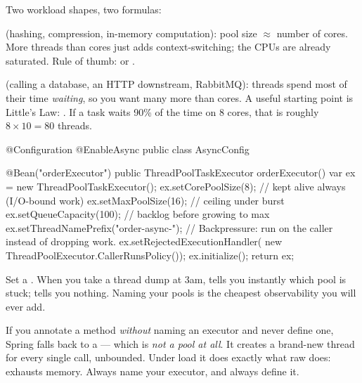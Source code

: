  Two workload shapes, two formulas:
\begin{wbitem}
  \item {} (hashing, compression, in-memory computation): pool size $\approx$ number of cores. More threads than cores just adds context-switching; the CPUs are already saturated. Rule of thumb:  or .
  \item {} (calling a database, an HTTP downstream, RabbitMQ): threads spend most of their time \emph{waiting}, so you want many more than cores. A useful starting point is Little's Law: . If a task waits 90\% of the time on 8 cores, that is roughly $8 \times 10 = 80$ threads.
\end{wbitem}

\begin{javabox}
@Configuration
@EnableAsync
public class AsyncConfig {

  @Bean("orderExecutor")
  public ThreadPoolTaskExecutor orderExecutor() {
    var ex = new ThreadPoolTaskExecutor();
    ex.setCorePoolSize(8);       // kept alive always (I/O-bound work)
    ex.setMaxPoolSize(16);       // ceiling under burst
    ex.setQueueCapacity(100);    // backlog before growing to max
    ex.setThreadNamePrefix("order-async-");
    // Backpressure: run on the caller instead of dropping work.
    ex.setRejectedExecutionHandler(
        new ThreadPoolExecutor.CallerRunsPolicy());
    ex.initialize();
    return ex;
  }
}
\end{javabox}

\begin{prodtip}
Set a . When you take a thread dump at 3am,  tells you instantly which pool is stuck;  tells you nothing. Naming your pools is the cheapest observability you will ever add.
\end{prodtip}

\begin{secwarn}
If you annotate a method  \emph{without} naming an executor and never define one, Spring falls back to a  --- which is \emph{not a pool at all}. It creates a brand-new thread for every single call, unbounded. Under load it does exactly what raw  does: exhausts memory. Always name your executor, and always define it.
\end{secwarn}

